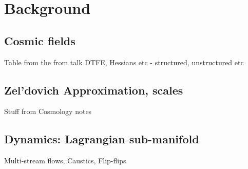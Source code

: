 \chapter{Background}

\section{Cosmic fields}
Table from the from talk
DTFE, Hessians etc - structured, unstructured etc

\section{Zel'dovich Approximation, scales}
Stuff from Cosmology notes

\section{Dynamics: Lagrangian sub-manifold}
Multi-stream flows, Caustics, Flip-flips

